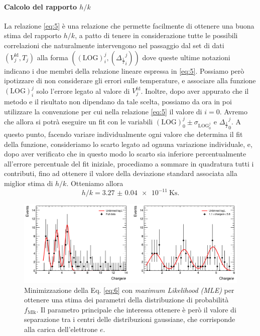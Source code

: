 \documentclass[a4paper, varvw, nofootinbib]{revtex4-2}
\begin{document}
\paragraph*{Calcolo del rapporto $h/k$} La relazione \eqref{eq:5} è una relazione che permette facilmente di ottenere una buona stima del rapporto $h/k$, a patto di tenere in considerazione tutte le possibili correlazioni che naturalmente intervengono nel passaggio dal set di dati $(V_j^\text{fd}, T_j)$ alla forma $((\text{LOG})_i^j, ({\Delta_{\frac{1}{T}}}_i^j))$ dove queste ultime notazioni indicano i due membri della relazione lineare espressa in \eqref{eq:5}. Possiamo però ipotizzare di non considerare gli errori sulle temperature, e associare alla funzione $(\text{LOG})_i^j$ solo l'errore legato al valore di $V_j^\text{fd}$. 
Inoltre, dopo aver appurato che il metodo e il risultato non dipendano da tale scelta, possiamo da ora in poi utilizzare la convenzione per cui nella relazione \eqref{eq:5} il valore di $i=0$. Avremo che allora si potrà eseguire un fit con le variabili $(\text{LOG})_0^j\pm\sigma_\text{LOG$_0^j$}$ e ${\Delta_{\frac{1}{T}}}_0^j$. A questo punto, facendo variare individualmente ogni valore che determina il fit della funzione, consideriamo lo scarto legato ad ognuna variazione individuale, e, dopo aver verificato che in questo modo lo scarto sia inferiore percentualmente all'errore percentuale del fit iniziale, procediamo a sommare in quadratura tutti i contributi, fino ad ottenere il valore della deviazione standard associata alla miglior stima di $h/k$. Otteniamo allora \[h/k = \SI{3.27(4)e-11}{\kelvin\second}.\]

\begin{figure}
\centering
\includegraphics[width=14cm]{fig/millikan}
\caption{Minimizzazione della Eq. \eqref{eq:6} con \emph{maximum Likelihood (MLE)} per ottenere una stima dei parametri della distribuzione di probabilità $f_\text{Mlk}$. Il parametro principale che interessa ottenere è però il valore di separazione tra i centri delle distribuzioni gaussiane, che corrisponde alla carica dell'elettrone $e$.}\label{fig:millikan}
\end{figure}
\end{document}
